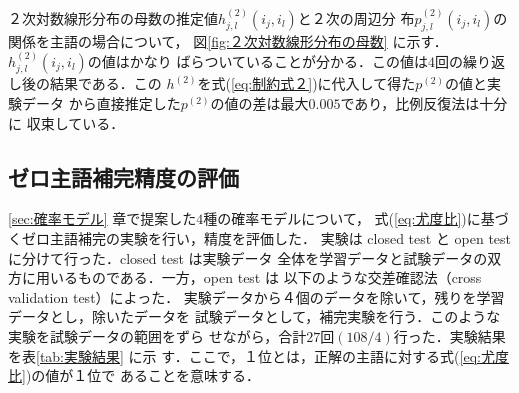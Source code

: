 ２次対数線形分布の母数の推定値$h^{(2)}_{j,l}(i_{j},i_{l})$と２次の周辺分
布$p^{(2)}_{j,l}(i_{j},i_{l})$の関係を主語の場合について，
図\ref{fig:２次対数線形分布の母数} に示す．
$h^{(2)}_{j,l}(i_{j},i_{l})$の値はかなり
ばらついていることが分かる．この値は$4$回の繰り返し後の結果である．この
$h^{(2)}$を式(\ref{eq:制約式２})に代入して得た$p^{(2)}$の値と実験データ
から直接推定した$p^{(2)}$の値の差は最大$0.005$であり，比例反復法は十分に
収束している．

\begin{figure}
\end{figure}

\subsection{ゼロ主語補完精度の評価}
\ref{sec:確率モデル} 章で提案した$4$種の確率モデルについて，
式(\ref{eq:尤度比})に基づくゼロ主語補完の実験を行い，精度を評価した．
実験は closed test と open test に分けて行った．closed test は実験データ
全体を学習データと試験データの双方に用いるものである．一方，open test は
以下のような交差確認法（cross validation test）によった．
実験データから４個のデータを除いて，残りを学習データとし，除いたデータを
試験データとして，補完実験を行う．このような実験を試験データの範囲をずら
せながら，合計$27$回$(108/4)$行った．実験結果を表\ref{tab:実験結果} に示
す．ここで，１位とは，正解の主語に対する式(\ref{eq:尤度比})の値が１位で
あることを意味する．

